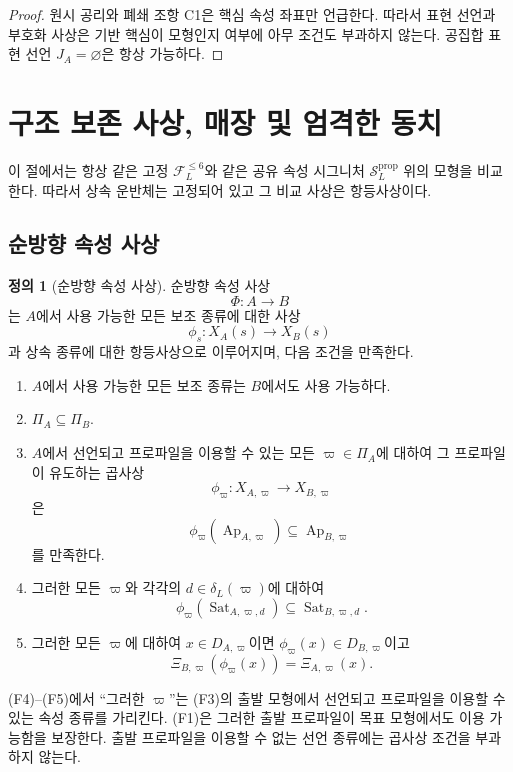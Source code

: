 \documentclass[11pt]{article}
\newcommand{\FVI}{\mathcal F_{L}^{\le 6}}
\newcommand{\Sprop}{\mathcal S_{L}^{\mathrm{prop}}}
\newcommand{\Ap}{\operatorname{Ap}}
\newcommand{\Sat}{\operatorname{Sat}}
\theoremstyle{definition}
\newtheorem{definition}[theorem]{정의}
\theoremstyle{remark}
\begin{document}
\begin{proof}
원시 공리와 폐쇄 조항 C1은 핵심 속성 좌표만 언급한다.
따라서 표현 선언과 부호화 사상은 기반 핵심이 모형인지 여부에 아무 조건도 부과하지 않는다.
공집합 표현 선언 \(J_A=\varnothing\)은 항상 가능하다.
\end{proof}

\section{구조 보존 사상, 매장 및 엄격한 동치}
\label{sec:maps}

이 절에서는 항상 같은 고정 \(\FVI\)와 같은 공유 속성 시그니처 \(\Sprop\) 위의 모형을 비교한다.
따라서 상속 운반체는 고정되어 있고 그 비교 사상은 항등사상이다.

\subsection{순방향 속성 사상}

\begin{definition}[순방향 속성 사상]
\label{def:forward-map}
순방향 속성 사상
\[
\Phi:A\longrightarrow B
\]
는 \(A\)에서 사용 가능한 모든 보조 종류에 대한 사상
\[
\phi_s:X_A(s)\longrightarrow X_B(s)
\]
과 상속 종류에 대한 항등사상으로 이루어지며, 다음 조건을 만족한다.
\begin{enumerate}[label=(F\arabic*)]
\item \(A\)에서 사용 가능한 모든 보조 종류는 \(B\)에서도 사용 가능하다.
\item \(\Pi_A\subseteq\Pi_B\).
\item \(A\)에서 선언되고 프로파일을 이용할 수 있는 모든 \(\varpi\in\Pi_A\)에 대하여 그 프로파일이 유도하는 곱사상
\[
\phi_{\varpi}:X_{A,\varpi}\longrightarrow X_{B,\varpi}
\]
은
\[
\phi_{\varpi}(\Ap_{A,\varpi})\subseteq\Ap_{B,\varpi}
\]
를 만족한다.
\item 그러한 모든 \(\varpi\)와 각각의 \(d\in\delta_L(\varpi)\)에 대하여
\[
\phi_{\varpi}(\Sat_{A,\varpi,d})\subseteq\Sat_{B,\varpi,d}.
\]
\item 그러한 모든 \(\varpi\)에 대하여 \(x\in D_{A,\varpi}\)이면 \(\phi_{\varpi}(x)\in D_{B,\varpi}\)이고
\[
\Xi_{B,\varpi}(\phi_{\varpi}(x))=\Xi_{A,\varpi}(x).
\]
\end{enumerate}
(F4)--(F5)에서 ``그러한 \(\varpi\)''는 (F3)의 출발 모형에서 선언되고 프로파일을 이용할 수 있는 속성 종류를 가리킨다.
(F1)은 그러한 출발 프로파일이 목표 모형에서도 이용 가능함을 보장한다.
출발 프로파일을 이용할 수 없는 선언 종류에는 곱사상 조건을 부과하지 않는다.
\end{definition}
\end{document}
